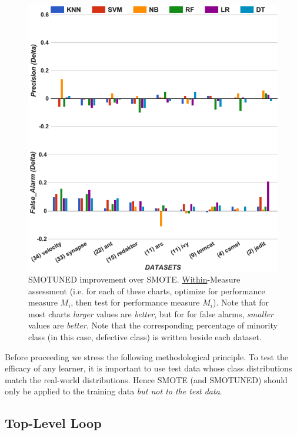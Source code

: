 \documentclass[10pt,conference]{IEEEtran}
\theoremstyle{break}
\theoremstyle{break}
\begin{document}
\begin{figure}[!t]
\begin{minipage}{.5\linewidth}
        \includegraphics[width=.95\linewidth]{./fig/prec_pf_tuned.png}
    \end{minipage}%
    
    \caption{SMOTUNED improvement over SMOTE. \underline{Within}-Measure
    assessment (i.e. for each of these charts,
    optimize for performance measure $M_i$, then test for
    performance measure $M_i$). Note that for most charts
    {\em larger} values are {\em better}, but for for false alarms,
    {\em smaller} values are {\em better}. Note that the corresponding percentage of minority class (in this case, defective class) is written beside each dataset.}
    \label{fig:tuned}
\vspace{-0.5cm}
\end{figure}


Before proceeding 
we   stress the following methodological
principle.
To test the efficacy of any learner, it is important to
use test data whose class distributions match the real-world distributions.
Hence SMOTE (and SMOTUNED) should only
be applied to the training data {\em but
not to the test data}.



\subsection{Top-Level Loop}
\end{document}
